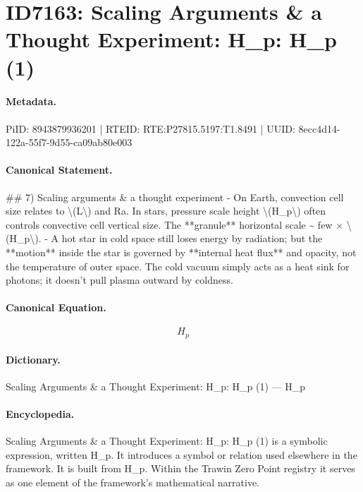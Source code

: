 \section*{ID7163: Scaling Arguments \& a Thought Experiment: H\_p: H\_p (1)}
\paragraph{Metadata.}
PiID: 8943879936201 | RTEID: RTE:P27815.5197:T1.8491 | UUID: 8ecc4d14-122a-55f7-9d55-ca09ab80e003

\paragraph{Canonical Statement.}
\#\# 7) Scaling arguments \& a thought experiment - On Earth, convection cell size relates to \textbackslash{}(L\textbackslash{}) and Ra. In stars, pressure scale height \textbackslash{}(H\_p\textbackslash{}) often controls convective cell vertical size. The **granule** horizontal scale \textasciitilde{} few × \textbackslash{}(H\_p\textbackslash{}). - A hot star in cold space still loses energy by radiation; but the **motion** inside the star is governed by **internal heat flux** and opacity, not the temperature of outer space. The cold vacuum simply acts as a heat sink for photons; it doesn’t pull plasma outward by coldness.

\paragraph{Canonical Equation.}
\[
H_p
\]

\paragraph{Dictionary.}
Scaling Arguments \& a Thought Experiment: H\_p: H\_p (1) — H\_p

\paragraph{Encyclopedia.}
Scaling Arguments \& a Thought Experiment: H\_p: H\_p (1) is a symbolic expression, written H\_p. It introduces a symbol or relation used elsewhere in the framework. It is built from H\_p. Within the Trawin Zero Point registry it serves as one element of the framework's mathematical narrative.
